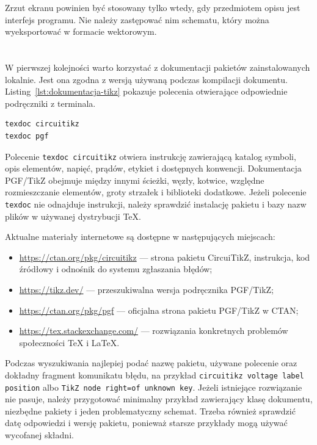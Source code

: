 Zrzut ekranu powinien być stosowany tylko wtedy, gdy przedmiotem opisu jest interfejs
programu. Nie należy zastępować nim schematu, który można wyeksportować w formacie
wektorowym.

\section{}

W pierwszej kolejności warto korzystać z dokumentacji pakietów zainstalowanych lokalnie.
Jest ona zgodna z wersją używaną podczas kompilacji dokumentu. Listing~\ref{lst:dokumentacja-tikz}
pokazuje polecenia otwierające odpowiednie podręczniki z terminala.

\begin{lstlisting}[style=thesis-shell,caption={Otwieranie lokalnej dokumentacji pakietów},label={lst:dokumentacja-tikz}]
texdoc circuitikz
texdoc pgf
\end{lstlisting}

Polecenie \verb|texdoc circuitikz| otwiera instrukcję zawierającą katalog symboli,
opis elementów, napięć, prądów, etykiet i dostępnych konwencji. Dokumentacja PGF/TikZ
obejmuje między innymi ścieżki, węzły, kotwice, względne rozmieszczanie elementów,
groty strzałek i biblioteki dodatkowe. Jeżeli polecenie \texttt{texdoc} nie odnajduje
instrukcji, należy sprawdzić instalację pakietu i bazy nazw plików w używanej dystrybucji
TeX.

Aktualne materiały internetowe są dostępne w następujących miejscach:

\begin{itemize}
  \item \url{https://ctan.org/pkg/circuitikz} --- strona pakietu CircuiTikZ,
        instrukcja, kod źródłowy i odnośnik do systemu zgłaszania błędów;
  \item \url{https://tikz.dev/} --- przeszukiwalna wersja podręcznika PGF/TikZ;
  \item \url{https://ctan.org/pkg/pgf} --- oficjalna strona pakietu PGF/TikZ w CTAN;
  \item \url{https://tex.stackexchange.com/} --- rozwiązania konkretnych problemów
        społeczności TeX i LaTeX.
\end{itemize}

Podczas wyszukiwania najlepiej podać nazwę pakietu, używane polecenie oraz dokładny
fragment komunikatu błędu, na przykład \texttt{circuitikz voltage label position} albo
\texttt{TikZ node right=of unknown key}. Jeżeli istniejące rozwiązanie nie pasuje,
należy przygotować minimalny przykład zawierający klasę dokumentu, niezbędne pakiety
i jeden problematyczny schemat. Trzeba również sprawdzić datę odpowiedzi i wersję
pakietu, ponieważ starsze przykłady mogą używać wycofanej składni.

